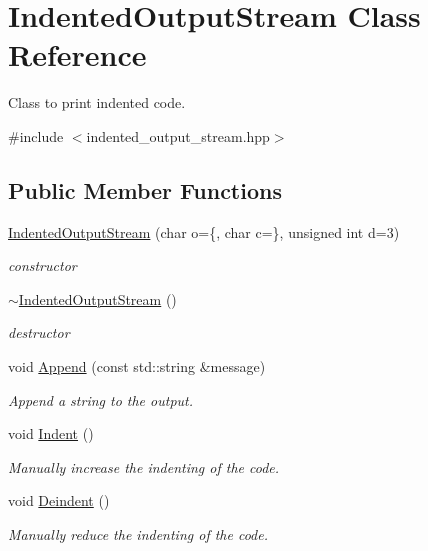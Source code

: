 \hypertarget{classIndentedOutputStream}{}\section{Indented\+Output\+Stream Class Reference}
\label{classIndentedOutputStream}


Class to print indented code.  




{\ttfamily \#include $<$indented\+\_\+output\+\_\+stream.\+hpp$>$}

\subsection*{Public Member Functions}
\begin{DoxyCompactItemize}
\item 
\hyperlink{classIndentedOutputStream_a2430afc5fcbd60ca82b9c3d1cf6fe78f}{Indented\+Output\+Stream} (char o=\textquotesingle{}\{\textquotesingle{}, char c=\textquotesingle{}\}\textquotesingle{}, unsigned int d=3)
\begin{DoxyCompactList}\small\item\em constructor \end{DoxyCompactList}\item 
\hyperlink{classIndentedOutputStream_a0f4421674c5dc1852476993372128509}{$\sim$\+Indented\+Output\+Stream} ()
\begin{DoxyCompactList}\small\item\em destructor \end{DoxyCompactList}\item 
void \hyperlink{classIndentedOutputStream_ab9c200e93872397c9dd09bf8c2d8b651}{Append} (const std\+::string \&message)
\begin{DoxyCompactList}\small\item\em Append a string to the output. \end{DoxyCompactList}\item 
void \hyperlink{classIndentedOutputStream_a875a467bf36c8409e362b1c345e66f6a}{Indent} ()
\begin{DoxyCompactList}\small\item\em Manually increase the indenting of the code. \end{DoxyCompactList}\item 
void \hyperlink{classIndentedOutputStream_a0f85e6d203422d7f1c690a3e8a1366fa}{Deindent} ()
\begin{DoxyCompactList}\small\item\em Manually reduce the indenting of the code. \end{DoxyCompactList}\item 

\end{DoxyCompactItemize}
